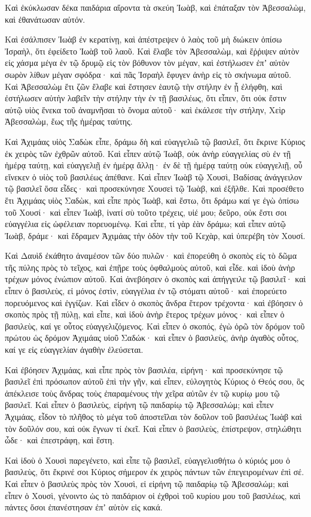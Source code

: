 {Καὶ ἐκύκλωσαν δέκα παιδάρια αἴροντα τὰ σκεύη Ἰωὰβ, καὶ ἐπάταξαν τὸν Ἀβεσσαλὼμ, καὶ ἐθανάτωσαν αὐτόν.
\par }{\PP {}Καὶ ἐσάλπισεν Ἰωὰβ ἐν κερατίνῃ, καὶ ἀπέστρεψεν ὁ λαὸς τοῦ μὴ διώκειν ὀπίσω Ἰσραὴλ, ὅτι ἐφείδετο Ἰωὰβ τοῦ λαοῦ.
Καὶ ἔλαβε τὸν Ἀβεσσαλὼμ, καὶ ἔῤῥιψεν αὐτὸν εἰς χάσμα μέγα ἐν τῷ δρυμῷ εἰς τὸν βόθυνον τὸν μέγαν, καὶ ἐστήλωσεν ἐπʼ αὐτὸν σωρὸν λίθων μέγαν σφόδρα· καὶ πᾶς Ἰσραὴλ ἔφυγεν ἀνὴρ εἰς τὸ σκήνωμα αὐτοῦ.
Καὶ Ἀβεσσαλὼμ ἔτι ζῶν ἔλαβε καὶ ἔστησεν ἑαυτῷ τὴν στήλην ἐν ᾗ ἐλήφθη, καὶ ἐστήλωσεν αὐτὴν λαβεῖν τὴν στήλην τὴν ἐν τῇ βασιλέως, ὅτι εἶπεν, ὅτι οὐκ ἔστιν αὐτῷ υἱὸς ἕνεκα τοῦ ἀναμνῆσαι τὸ ὄνομα αὐτοῦ· καὶ ἐκάλεσε τὴν στήλην, Χεὶρ Ἀβεσσαλὼμ, ἕως τῆς ἡμέρας ταύτης.
\par }{\PP {}Καὶ Ἀχιμάας υἱὸς Σαδὼκ εἶπε, δράμω δὴ καὶ εὐαγγελιῶ τῷ βασιλεῖ, ὅτι ἔκρινε Κύριος ἐκ χειρὸς τῶν ἐχθρῶν αὐτοῦ.
Καὶ εἶπεν αὐτῷ Ἰωὰβ, οὐκ ἀνὴρ εὐαγγελίας σὺ ἐν τῇ ἡμέρᾳ ταύτῃ, καὶ εὐαγγελιῇ ἐν ἡμέρᾳ ἄλλῃ· ἐν δὲ τῇ ἡμέρᾳ ταύτῃ οὐκ εὐαγγελιῇ, οὗ εἵνεκεν ὁ υἱὸς τοῦ βασιλέως ἀπέθανε.
Καὶ εἶπεν Ἰωὰβ τῷ Χουσὶ, Βαδίσας ἀνάγγειλον τῷ βασιλεῖ ὅσα εἶδες· καὶ προσεκύνησε Χουσεὶ τῷ Ἰωὰβ, καὶ ἐξῆλθε.
Καὶ προσέθετο ἕτι Ἀχιμάας υἱὸς Σαδὼκ, καὶ εἶπε πρὸς Ἰωὰβ, καὶ ἔστω, ὅτι δράμω καί γε ἐγὼ ὀπίσω τοῦ Χουσί· καὶ εἶπεν Ἰωὰβ, ἱνατί σὺ τοῦτο τρέχεις, υἱέ μου; δεῦρο, οὐκ ἔστι σοι εὐαγγέλια εἰς ὠφέλειαν πορευομένῳ.
Καὶ εἶπε, τί γὰρ ἐὰν δράμω; καὶ εἶπεν αὐτῷ Ἰωὰβ, δράμε· καὶ ἔδραμεν Ἀχιμάας τὴν ὁδὸν τὴν τοῦ Κεχὰρ, καὶ ὑπερέβη τὸν Χουσί.
\par }{\PP {}Καὶ Δαυὶδ ἐκάθητο ἀναμέσον τῶν δύο πυλῶν· καὶ ἐπορεύθη ὁ σκοπὸς εἰς τὸ δῶμα τῆς πύλης πρὸς τὸ τεῖχος, καὶ ἐπῇρε τοὺς ὀφθαλμοὺς αὐτοῦ, καὶ εἶδε. καὶ ἰδοὺ ἀνὴρ τρέχων μόνος ἐνώπιον αὐτοῦ.
Καὶ ἀνεβόησεν ὁ σκοπὸς καὶ ἀπήγγειλε τῷ βασιλεῖ· καὶ εἶπεν ὁ βασιλεὺς, εἰ μόνος ἐστὶν, εὐαγγέλια ἐν τῷ στόματι αὐτοῦ· καὶ ἐπορεύετο πορευόμενος καὶ ἐγγίζων.
Καὶ εἶδεν ὁ σκοπὸς ἄνδρα ἕτερον τρέχοντα· καὶ ἐβόησεν ὁ σκοπὸς πρὸς τῇ πύλῃ, καὶ εἶπε, καὶ ἰδοὺ ἀνὴρ ἕτερος τρέχων μόνος· καὶ εἶπεν ὁ βασιλεὺς, καί γε οὗτος εὐαγγελιζόμενος.
Καὶ εἶπεν ὁ σκοπός, ἐγὼ ὁρῶ τὸν δρόμον τοῦ πρώτου ὡς δρόμον Ἀχιμάας υἱοῦ Σαδώκ· καὶ εἶπεν ὁ βασιλεὺς, ἀνὴρ ἀγαθὸς οὗτος, καί γε εἰς εὐαγγελίαν ἀγαθὴν ἐλεύσεται.
\par }{\PP {}Καὶ ἐβόησεν Ἀχιμάας, καὶ εἶπε πρὸς τὸν βασιλέα, εἰρήνη· καὶ προσεκύνησε τῷ βασιλεῖ ἐπὶ πρόσωπον αὐτοῦ ἐπὶ τὴν γῆν, καὶ εἶπεν, εὐλογητὸς Κύριος ὁ Θεός σου, ὃς ἀπέκλεισε τοὺς ἄνδρας τοὺς ἐπαραμένους τὴν χεῖρα αὐτῶν ἐν τῷ κυρίῳ μου τῷ βασιλεῖ.
Καὶ εἶπεν ὁ βασιλεὺς, εἰρήνη τῷ παιδαρίῳ τῷ Ἀβεσσαλώμ; καὶ εἶπεν Ἀχιμάας, εἶδον τὸ πλῆθος τὸ μέγα τοῦ ἀποστεῖλαι τὸν δοῦλον τοῦ βασιλέως Ἰωὰβ καὶ τὸν δοῦλόν σου, καὶ οὐκ ἔγνων τί ἐκεῖ.
Καὶ εἶπεν ὁ βασιλεὺς, ἐπίστρεψον, στηλώθητι ὧδε· καὶ ἐπεστράφη, καὶ ἔστη.
\par }{\PP {}Καὶ ἰδοὺ ὁ Χουσὶ παρεγένετο, καὶ εἶπε τῷ βασιλεῖ, εὐαγγελισθήτω ὁ κύριός μου ὁ βασιλεὺς, ὅτι ἔκρινέ σοι Κύριος σήμερον ἐκ χειρὸς πάντων τῶν ἐπεγειρομένων ἐπὶ σέ.
Καὶ εἶπεν ὁ βασιλεὺς πρὸς τὸν Χουσὶ, εἰ εἰρήνη τῷ παιδαρίῳ τῷ Ἀβεσσαλώμ; καὶ εἶπεν ὁ Χουσὶ, γένοιντο ὡς τὸ παιδάριον οἱ ἐχθροὶ τοῦ κυρίου μου τοῦ βασιλέως, καὶ πάντες ὅσοι ἐπανέστησαν ἐπʼ αὐτὸν εἰς κακά.

}
